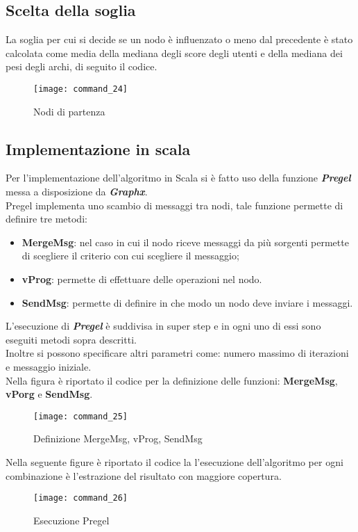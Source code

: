 \subsection{Scelta della soglia}
La soglia per cui si decide se un nodo è influenzato o meno dal precedente è stato
calcolata come media della mediana degli score degli utenti e della mediana dei pesi
degli archi, di seguito il codice.

\begin{figure}[!htbp]
  \texttt{[image: command\_24]}
  \caption{Nodi di partenza}
  \label{command_24}
\end{figure}
\clearpage

\subsection{Implementazione in scala}
Per l'implementazione dell'algoritmo in Scala si è fatto uso della funzione \textit{\textbf{Pregel}}
messa a disposizione da \textit{\textbf{Graphx}}.\\
Pregel implementa uno scambio di messaggi tra nodi, tale funzione permette di definire tre
metodi:
\begin{itemize}
	\item \textbf{MergeMsg}: nel caso in cui il nodo riceve messaggi da più sorgenti permette
	di scegliere il criterio con cui scegliere il messaggio;
	\item \textbf{vProg}: permette di effettuare delle operazioni nel nodo.
	\item \textbf{SendMsg}: permette di definire in che modo un nodo deve inviare i messaggi.
\end{itemize}
L'esecuzione di \textit{\textbf{Pregel}} è suddivisa in super step e in ogni uno di essi
sono eseguiti metodi sopra descritti.\\
Inoltre si possono specificare altri parametri come: numero massimo di iterazioni e messaggio iniziale.\\
Nella figura è riportato il codice per la definizione delle funzioni: \textbf{MergeMsg}, \textbf{vPorg} e \textbf{SendMsg}.
\begin{figure}[!htbp]
  \texttt{[image: command\_25]}
  \caption{Definizione MergeMsg, vProg, SendMsg}
  \label{command_25}
\end{figure}
\clearpage

Nella seguente figure è riportato il codice la l'esecuzione dell'algoritmo per ogni combinazione è l'estrazione
del risultato con maggiore copertura.
\begin{figure}[!htbp]
  \texttt{[image: command\_26]}
  \caption{Esecuzione Pregel}
  \label{command_26}
\end{figure}
\clearpage
